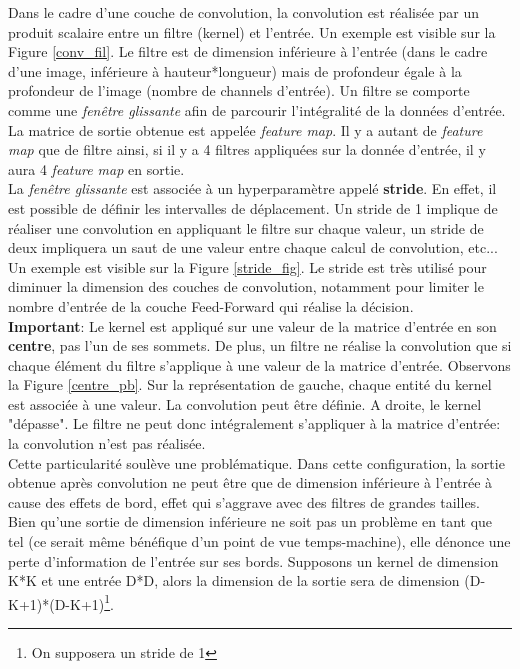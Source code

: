 \noindent Dans le cadre d'une couche de convolution, la convolution est réalisée par un produit scalaire entre un filtre (kernel) et l'entrée. Un exemple est visible sur la Figure \ref{conv_fil}. Le filtre est de dimension inférieure à l'entrée (dans le cadre d'une image, inférieure à hauteur*longueur) mais de profondeur égale à la profondeur de l'image (nombre de channels d'entrée). Un filtre se comporte comme une \textit{fenêtre glissante} afin de parcourir l'intégralité de la données d'entrée. La matrice de sortie obtenue est appelée \textit{feature map}. Il y a autant de \textit{feature map} que de filtre ainsi, si il y a 4 filtres appliquées sur la donnée d'entrée, il y aura 4 \textit{feature map} en sortie.\\

\noindent La \textit{fenêtre glissante} est associée à un hyperparamètre appelé \textbf{stride}. En effet, il est possible de définir les intervalles de déplacement. Un stride de 1 implique de réaliser une convolution en appliquant le filtre sur chaque valeur, un stride de deux impliquera un saut de une valeur entre chaque calcul de convolution, etc... Un exemple est visible sur la Figure \ref{stride_fig}. Le stride est très utilisé pour diminuer la dimension des couches de convolution, notamment pour limiter le nombre d'entrée de la couche Feed-Forward qui réalise la décision.\\

\noindent \textbf{Important}: Le kernel est appliqué sur une valeur de la matrice d'entrée en son \textbf{centre}, pas l'un de ses sommets. De plus, un filtre ne réalise la convolution que si chaque élément du filtre s'applique à une valeur de la matrice d'entrée. Observons la Figure \ref{centre_pb}. Sur la représentation de gauche, chaque entité du kernel est associée à une valeur. La convolution peut être définie. A droite, le kernel "dépasse". Le filtre ne peut donc intégralement s'appliquer à la matrice d'entrée: la convolution n'est pas réalisée.\\

\noindent Cette particularité soulève une problématique. Dans cette configuration, la sortie obtenue après convolution ne peut être que de dimension inférieure à l'entrée à cause des effets de bord, effet qui s'aggrave avec des filtres de grandes tailles. Bien qu'une sortie de dimension inférieure ne soit pas un problème en tant que tel (ce serait même bénéfique d'un point de vue temps-machine), elle dénonce une perte d'information de l'entrée sur ses bords. Supposons un kernel de dimension K*K et une entrée D*D, alors la dimension de la sortie sera de dimension (D-K+1)*(D-K+1)\footnote{On supposera un stride de 1}.\\

